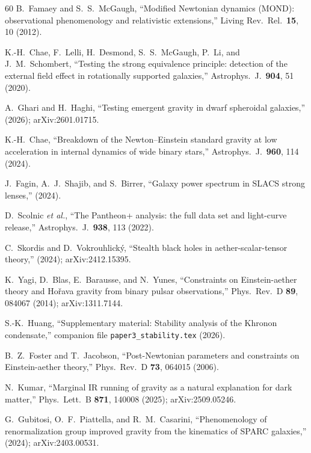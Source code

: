 \documentclass[prd,twocolumn,superscriptaddress,longbibliography,floatfix]{revtex4-2}
\begin{document}
\begin{thebibliography}{60}
B.~Famaey and S.~S.~McGaugh,
``Modified Newtonian dynamics (MOND): observational phenomenology
and relativistic extensions,''
Living Rev.\ Rel.\ \textbf{15}, 10 (2012).

K.-H.~Chae, F.~Lelli, H.~Desmond, S.~S.~McGaugh,
P.~Li, and J.~M.~Schombert,
``Testing the strong equivalence principle: detection of the
external field effect in rotationally supported galaxies,''
Astrophys.\ J.\ \textbf{904}, 51 (2020).

A.~Ghari and H.~Haghi,
``Testing emergent gravity in dwarf spheroidal galaxies,''
(2026); arXiv:2601.01715.

K.-H.~Chae,
``Breakdown of the Newton--Einstein standard gravity at low
acceleration in internal dynamics of wide binary stars,''
Astrophys.\ J.\ \textbf{960}, 114 (2024).

J.~Fagin, A.~J.~Shajib, and S.~Birrer,
``Galaxy power spectrum in SLACS strong lenses,''
(2024).

D.~Scolnic \emph{et al.},
``The Pantheon+ analysis: the full data set and light-curve
release,''
Astrophys.\ J.\ \textbf{938}, 113 (2022).

C.~Skordis and D.~Vokrouhlick\'{y},
``Stealth black holes in aether-scalar-tensor theory,''
(2024); arXiv:2412.15395.

K.~Yagi, D.~Blas, E.~Barausse, and N.~Yunes,
``Constraints on Einstein-aether theory and Ho\v{r}ava
gravity from binary pulsar observations,''
Phys.\ Rev.\ D \textbf{89}, 084067 (2014);
arXiv:1311.7144.

S.-K.~Huang,
``Supplementary material: Stability analysis of the Khronon
condensate,''
companion file \texttt{paper3\_stability.tex} (2026).

B.~Z.~Foster and T.~Jacobson,
``Post-Newtonian parameters and constraints on Einstein-aether
theory,''
Phys.\ Rev.\ D \textbf{73}, 064015 (2006).

N.~Kumar,
``Marginal IR running of gravity as a natural explanation for
dark matter,''
Phys.\ Lett.\ B \textbf{871}, 140008 (2025);
arXiv:2509.05246.

G.~Gubitosi, O.~F.~Piattella, and R.~M.~Casarini,
``Phenomenology of renormalization group improved gravity from
the kinematics of SPARC galaxies,''
(2024); arXiv:2403.00531.


\end{thebibliography}
\end{document}
